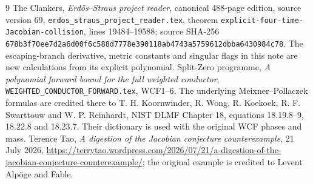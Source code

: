 \documentclass[11pt]{article}
\begin{document}
\begin{thebibliography}{9}
 The Clankers, \emph{Erd\H{o}s--Straus project
reader}, canonical 488-page edition, source version 69,
\texttt{erdos\_straus\_project\_reader.tex}, theorem
\texttt{explicit-four-time-Jacobian-collision}, lines 19484--19588;
source SHA-256
\texttt{678b3f70ee7d2a6d00f6c588d7778e390118ab4743a5759612dbba6430984c78}.
The escaping-branch derivative, metric constants and singular flags
in this note are new calculations from its explicit polynomial.
 Split-Zero programme, \emph{A polynomial forward
bound for the full weighted conductor},
\texttt{WEIGHTED\_CONDUCTOR\_FORWARD.tex}, WCF1--6.
The underlying Meixner--Pollaczek formulas are credited there to
T. H. Koornwinder, R. Wong, R. Koekoek, R. F. Swarttouw and
W. P. Reinhardt, NIST DLMF Chapter 18, equations 18.19.8--9,
18.22.8 and 18.23.7. Their dictionary is used with the original
WCF phases and mass.
 Terence Tao, \emph{A digestion of the Jacobian
conjecture counterexample}, 21 July 2026,
\url{https://terrytao.wordpress.com/2026/07/21/a-digestion-of-the-jacobian-conjecture-counterexample/};
the original example is credited to Levent Alp\"oge and Fable.
\end{thebibliography}
\end{document}
